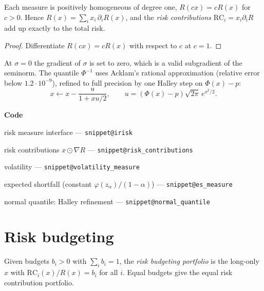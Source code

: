 \documentclass[11pt,a4paper]{article}
\makeatletter
\newcommand{\snippetsource}[1]{\csname snippet@#1\endcsname}
\newcommand{\snippet}[3]{%
  }
\newenvironment{codepointers}{%
  \par\smallskip\begingroup\footnotesize\noindent\textcolor{blue!50!black}{\textbf{Code}}\par\nopagebreak
  \begin{list}{}{\setlength{\leftmargin}{1.2em}\setlength{\itemsep}{0pt}\setlength{\parsep}{0pt}\setlength{\topsep}{1pt}}}%
  {\end{list}\endgroup\smallskip}
\newcommand{\codeitem}[2]{\item #2 --- \texttt{\snippetsource{#1}}}
\makeatother
\begin{document}
\begin{proposition}
Each measure is positively homogeneous of degree one, $R(cx)=cR(x)$ for $c>0$. Hence
$R(x)=\sum_ix_i\,\partial_iR(x)$, and the \emph{risk contributions}
$\mathrm{RC}_i=x_i\partial_iR$ add up exactly to the total risk.
\end{proposition}
\begin{proof}
Differentiate $R(cx)=cR(x)$ with respect to $c$ at $c=1$.
\end{proof}
At $\sigma=0$ the gradient of $\sigma$ is set to zero, which is a valid subgradient of the
seminorm. The quantile $\Phi^{-1}$ uses Acklam's rational approximation (relative error
below $1.2\cdot10^{-9}$), refined to full precision by one Halley step on $\Phi(x)-p$:
\[
  x\leftarrow x-\frac{u}{1+xu/2},\qquad u=(\Phi(x)-p)\sqrt{2\pi}\,e^{x^2/2}.
\]
\snippet{vol_gradient}{C++}{Volatility gradient, the building block of every measure}
\snippet{var_measure}{C++}{Gaussian VaR and its gradient}
\begin{codepointers}
  \codeitem{irisk}{risk measure interface}
  \codeitem{risk_contributions}{risk contributions $x\odot\nabla R$}
  \codeitem{volatility_measure}{volatility}
  \codeitem{es_measure}{expected shortfall (constant $\varphi(z_\alpha)/(1-\alpha)$)}
  \codeitem{normal_quantile}{normal quantile: Halley refinement}
\end{codepointers}

\section{Risk budgeting}\label{sec:riskbudgeting}

Given budgets $b_i>0$ with $\sum_ib_i=1$, the \emph{risk budgeting portfolio} is the
long-only $x$ with $\mathrm{RC}_i(x)/R(x)=b_i$ for all $i$. Equal budgets give the equal risk
contribution portfolio.
\end{document}
